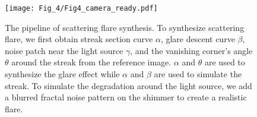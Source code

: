 \documentclass{article}
\begin{document}
\begin{figure}[!t]
\centering
\texttt{[image: Fig\_4/Fig4\_camera\_ready.pdf]}
\vspace{-6mm}
\caption{The pipeline of scattering flare synthesis. To synthesize scattering flare, we first obtain streak section curve $\alpha$, glare descent curve $\beta$, noise patch near the light source $\gamma$, and the vanishing corner's angle $\theta$ around the streak from the reference image. $\alpha$ and $\theta$ are used to synthesize the glare effect while $\alpha$ and $\beta$ are used to simulate the streak. To simulate the degradation around the light source, we add a blurred fractal noise pattern on the shimmer to create a realistic flare.}
\vspace{-5mm}
\label{fig:flare_generation} 
\end{figure}
\end{document}
